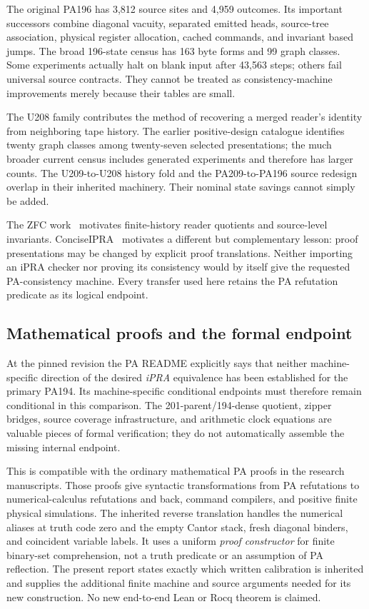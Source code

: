 The original PA196 has 3,812 source sites and 4,959 outcomes. Its important
successors combine diagonal vacuity, separated emitted heads, source-tree
association, physical register allocation, cached commands, and invariant
based jumps. The broad 196-state census has 163 byte forms and 99 graph
classes. Some experiments actually halt on blank input after 43,563 steps;
others fail universal source contracts. They cannot be treated as
consistency-machine improvements merely because their tables are small.

The U208 family contributes the method of recovering a merged reader's
identity from neighboring tape history. The earlier positive-design
catalogue identifies twenty graph classes among twenty-seven selected
presentations; the much broader current census includes generated
experiments and therefore has larger counts. The U209-to-U208 history
fold and the PA209-to-PA196 source redesign overlap in their inherited
machinery. Their nominal state savings cannot simply be added.

The ZFC work~\cite{zfc} motivates finite-history reader quotients and source-level
invariants. ConciseIPRA~\cite{ipra} motivates a different but complementary lesson:
proof presentations may be changed by explicit proof translations.
Neither importing an iPRA checker nor proving its consistency would by
itself give the requested PA-consistency machine. Every transfer used here
retains the PA refutation predicate as its logical endpoint.

\subsection{Mathematical proofs and the formal endpoint}
At the pinned revision the PA README explicitly says that neither
machine-specific direction of the desired \emph{iPRA} equivalence has
been established for the primary PA194. Its machine-specific conditional
endpoints must therefore remain conditional in this comparison. The
201-parent/194-dense quotient, zipper bridges, source coverage infrastructure,
and arithmetic clock equations are valuable pieces of formal verification;
they do not automatically assemble the missing internal endpoint.

This is compatible with the ordinary mathematical PA proofs in the
research manuscripts. Those proofs give syntactic transformations from PA
refutations to numerical-calculus refutations and back, command compilers,
and positive finite physical simulations. The inherited reverse
translation handles the numerical aliases at truth code zero and the
empty Cantor stack, fresh diagonal binders, and coincident variable labels.
It uses a uniform \emph{proof constructor} for finite binary-set
comprehension, not a truth predicate or an assumption of PA reflection.
The present report states exactly which written calibration is inherited
and supplies the additional finite machine and source arguments needed
for its new construction. No new end-to-end Lean or Rocq theorem is claimed.
